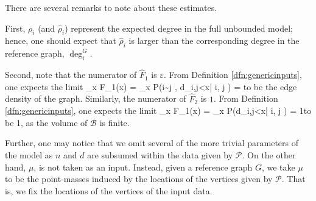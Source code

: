 \documentclass[11]{article}
\def\bas #1\eas{\begin{align*} #1 \end{align*}}
\theoremstyle{remark}
\theoremstyle{definition}
\begin{document}
There are several remarks to note about these estimates.

First, $\rho_i$ (and $\hat \rho_i$) represent the expected degree in the full unbounded model; hence, one should expect that $\hat \rho_i$ is larger than the corresponding degree in the reference graph, $\deg^G_i$.

Second, note that the numerator of $\hat F_1$ is $\varepsilon$. From Definition \ref{dfn:genericinputs}, one expects the limit \bas \lim_{x \to \infty} F_1(x) = \lim_{x \to \infty} P(i\sim j , d_{i,j}<x| i, j \in {}) = \varepsilon\eas to be the edge density of the graph. Similarly, 
the numerator of $\hat F_2$ is $1$. From Definition \ref{dfn:genericinputs}, one expects the limit \bas \lim_{x \to \infty} F_1(x) = \lim_{x \to \infty} P(d_{i,j}<x| i, j \in {}) =  1\eas to be 1, as the volume of $\mathcal{B}$ is finite.


Further, one may notice that we omit several of the more trivial parameters of the model as $n$ and $d$ are subsumed within the data given by $\mathcal{P}$. On the other hand, $\mu$, is not taken as an input. Instead, given a reference graph $G$, we take $\mu$ to be the point-masses induced by the locations of the vertices given by $\mathcal{P}$. That is, we fix the locations of the vertices of the input data. %

    
    
\end{document}
